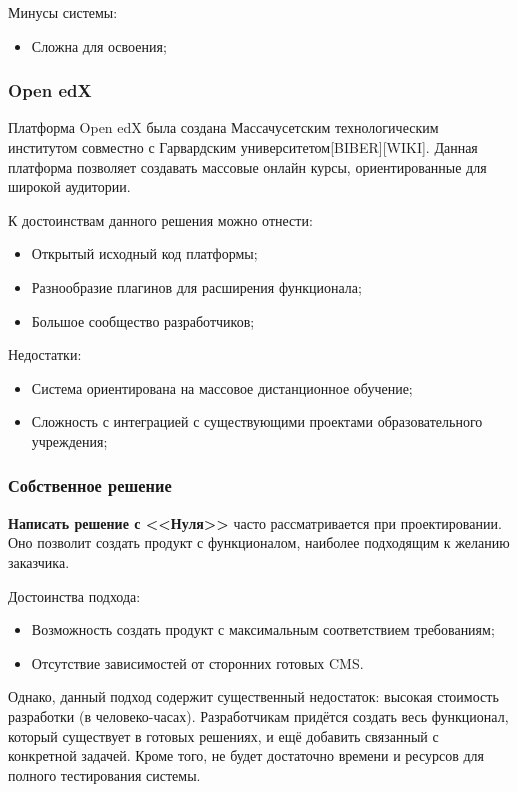 \documentclass[a4paper,14pt]{article}
\begin{document}
Минусы системы:

\begin{itemize}
	\item Сложна для освоения;
\end{itemize} 


\subsubsection{Open edX} 

Платформа Open edX была создана Массачусетским технологическим институтом совместно с Гарвардским университетом[BIBER][WIKI].
Данная платформа позволяет создавать массовые онлайн курсы, ориентированные для широкой аудитории.

К достоинствам данного решения можно отнести:

\begin{itemize}
	\item Открытый исходный код платформы;
	\item Разнообразие плагинов для расширения функционала;
	\item Большое сообщество разработчиков;
\end{itemize}

Недостатки:

\begin{itemize}
	\item Система ориентирована на массовое дистанционное обучение;
	\item Сложность с интеграцией с существующими проектами образовательного учреждения;
\end{itemize}

\subsubsection{Собственное решение} 

\textbf{Написать решение с <<Нуля>>} часто рассматривается при проектировании.
Оно позволит создать продукт с функционалом, наиболее подходящим к желанию заказчика.

Достоинства подхода:

\begin{itemize}
	\item Возможность создать продукт с максимальным соответствием требованиям;
	\item Отсутствие зависимостей от сторонних готовых CMS.
\end{itemize}

Однако, данный подход содержит существенный недостаток: высокая стоимость разработки (в человеко-часах).
Разработчикам придётся создать весь функционал, который существует в готовых решениях,  и ещё добавить связанный с конкретной задачей.
Кроме того, не будет достаточно времени и ресурсов для полного тестирования системы.
\end{document}
